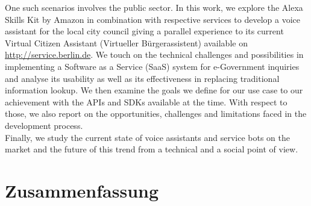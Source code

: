 One such scenarios involves the public sector. In this work, we explore the Alexa Skills Kit by Amazon in combination with respective services to develop a voice assistant for the local city council 
giving a parallel experience to its current Virtual Citizen Assistant (Virtueller Bürgerassistent) %
available on \href{ https://service.berlin.de/virtueller-assistent/virtueller-assistent-606279.php}{http://service.berlin.de}. We touch on the technical challenges and possibilities in implementing a Software as a Service (SaaS) system for e-Government inquiries and analyse its usability as well as its effectiveness in replacing traditional information lookup. We then examine the goals we define for our use case to our achievement with the APIs and SDKs available at the time. With respect to those, we also report on the opportunities, challenges and limitations faced in the development process.\\

Finally, we study the current state of voice assistants and service bots on the market and the future of this trend from a technical and a social point of view.




\newpage
\chapter*{Zusammenfassung}

